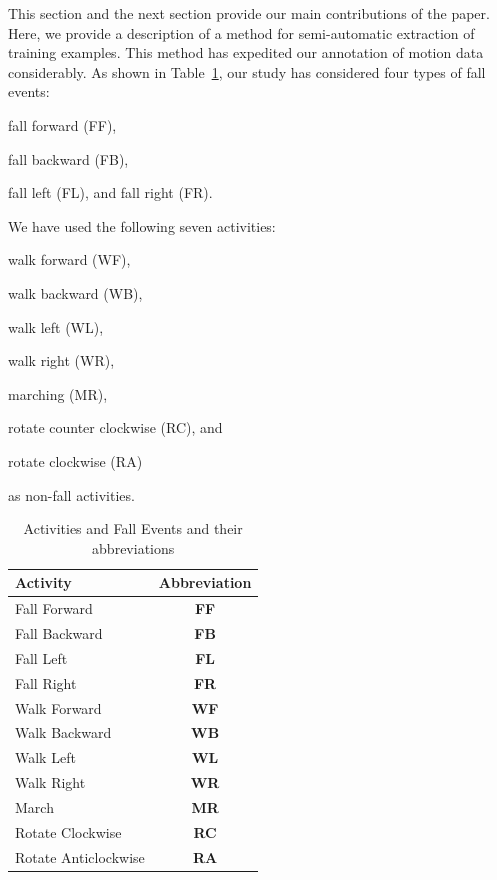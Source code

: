 \documentclass[]{IEEEtran}
\begin{document}
This section and the next section provide our main contributions of the paper.
Here, we provide a description of a method for semi-automatic extraction of
training examples. This method has expedited our annotation of motion data
considerably. As shown in Table~\ref{Tbl:ListOfActivities},  our study has
considered four types of fall events: \begin{inparaenum}[1)] \item fall forward
({\sf FF}), \item fall backward ({\sf FB}), \item fall left ({\sf FL}), and
fall right ({\sf FR}). \end{inparaenum} We have used the following seven
activities:\begin{inparaenum}[1)] \item walk forward ({\sf WF}), \item walk
backward ({\sf WB}), \item walk left ({\sf WL}), \item walk right ({\sf WR}),
\item marching ({\sf MR}), \item rotate counter clockwise ({\sf RC}), and \item
rotate clockwise ({\sf RA})  \end{inparaenum} as non-fall activities. 

\begin{table}[htb]
\caption{Activities and Fall Events and their abbreviations}
\centering
{
\begin{tabular}{|l|c|}
\hline
\textbf{Activity} & \textbf{Abbreviation} \\  \hline
Fall Forward &\textbf{FF} \\ \hline
Fall Backward &\textbf{FB}  \\ \hline
Fall Left &\textbf{FL}  \\ \hline
Fall Right &\textbf{FR}  \\ \hline \hline
Walk Forward &\textbf{WF} \\ \hline
Walk Backward &\textbf{WB} \\ \hline
Walk Left &\textbf{WL} \\ \hline
Walk Right &\textbf{WR}  \\ \hline
March &\textbf{MR}  \\ \hline
Rotate Clockwise &\textbf{RC} \\ \hline
Rotate Anticlockwise&\textbf{RA}  \\ \hline
\end{tabular}
}
\label{Tbl:ListOfActivities}
\end{table}
\end{document}
